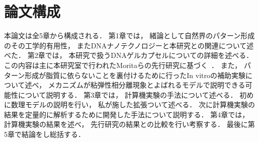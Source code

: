 \section{論文構成}
本論文は全5章から構成される．
第1章では，
緒論として自然界のパターン形成のその工学的有用性，
またDNAナノテクノロジーと本研究との関連について述べた．
第2章では，
本研究で扱うDNAゲルカプセルについての詳細を述べる．
この内容は主に本研究室で行われたMoritaらの先行研究に基づく~\cite{morita2017formation}．
また，
パターン形成が脂質に依らないことを裏付けるために行ったIn vitroの補助実験について述べ，
メカニズムが粘弾性相分離現象とよばれるモデルで説明できる可能性について説明する．
第3章では，
計算機実験の手法について述べる．
初めに数理モデルの説明を行い，
私が施した拡張ついて述べる．
次に計算機実験の結果を定量的に解析するために開発した手法について説明する．
第4章では，
計算機実験の結果を述べ，
先行研究の結果との比較を行い考察する．
最後に第5章で結論をし総括する．
